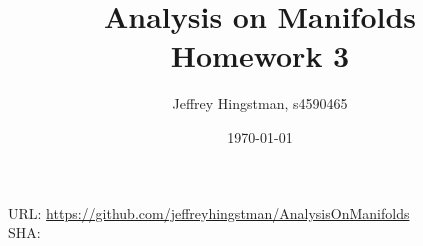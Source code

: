 \documentclass[a4paper, 12pt]{article}
\newcommand{\reponame}{https://github.com/jeffreyhingstman/AnalysisOnManifolds}    %
\begin{document}
	\title{Analysis on Manifolds \\[0.5cm] \large{Homework 3}} 
	\date{\today}
	\author{Jeffrey Hingstman, s4590465}	\maketitle
	\vspace*{\fill}
	\noindent
	URL: \url{\reponame} \\
	SHA: \commithash
	\clearpage
	
	
	

	
\end{document}
